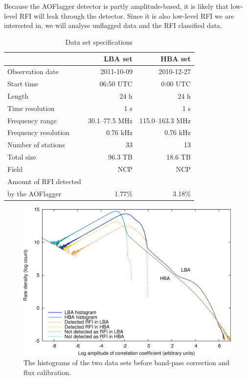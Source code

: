 \documentclass[useAMS,usenatbib]{mn2e}
\begin{document}
Because the AOFlagger detector is partly amplitude-based, it is likely that low-level RFI will leak through the detector. Since it is also low-level RFI we are interested in, we will analyse unflagged data and the RFI classified data.

\begin{table}
\caption{Data set specifications}\label{table:dist-data-specs}
\begin{center}
\begin{tabular}{lrr}
                    & \textbf{LBA set}& \textbf{HBA set} \\
\hline
\hline
Observation date    & 2011-10-09      & 2010-12-27 \\
Start time          & 06:50 UTC       & 0:00 UTC \\
Length              & 24 h           & 24 h \\
Time resolution     & 1 s             & 1 s \\
\hline
Frequency range     &  30.1--77.5 MHz & 115.0--163.3 MHz\\
Frequency resolution & 0.76 kHz    & 0.76 kHz \\
Number of stations  &  33           & 13 \\
Total size          & 96.3 TB        & 18.6 TB \\
\hline
Field               & NCP             & NCP \\
Amount of RFI detected & & \\
by the AOFlagger    & 1.77\%       & 3.18\% \\
\hline
\hline
\end{tabular}
\end{center}
\end{table}

\begin{figure}
\begin{center}
\includegraphics[width=12cm]{img/histograms-raw-trimmed}
\caption{The histograms of the two data sets before band-pass correction and flux calibration.}
\label{fig:Histograms-raw}
\end{center}
\end{figure}
\end{document}
